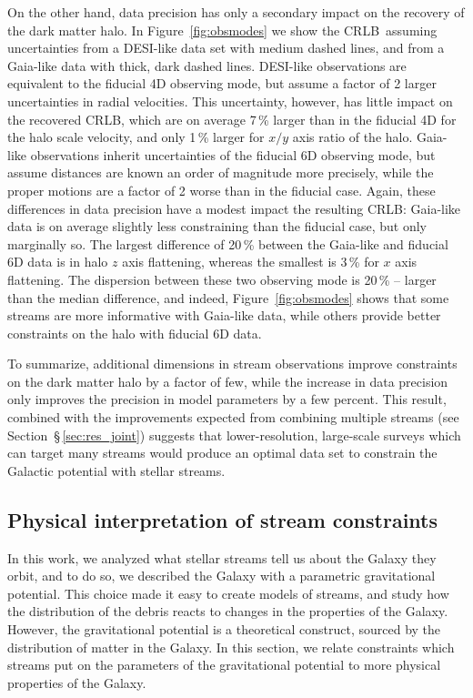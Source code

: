 \documentclass[modern]{aastex61}
\newcommand{\acronym}[1]{{\small{#1}}}
\newcommand{\CRLB}{\acronym{CRLB}}
\begin{document}
On the other hand, data precision has only a secondary impact on the recovery of the dark matter halo.
In Figure~\ref{fig:obsmodes} we show the \CRLB\ assuming uncertainties from a DESI-like data set with medium dashed lines, and from a Gaia-like data with thick, dark dashed lines.
DESI-like observations are equivalent to the fiducial 4D observing mode, but assume a factor of 2 larger uncertainties in radial velocities.
This uncertainty, however, has little impact on the recovered \CRLB, which are on average 7\,\% larger than in the fiducial 4D for the halo scale velocity, and only 1\,\% larger for $x/y$ axis ratio of the halo.
Gaia-like observations inherit uncertainties of the fiducial 6D observing mode, but assume distances are known an order of magnitude more precisely, while the proper motions are a factor of 2 worse than in the fiducial case.
Again, these differences in data precision have a modest impact the resulting \CRLB: Gaia-like data is on average slightly less constraining than the fiducial case, but only marginally so.
The largest difference of 20\,\% between the Gaia-like and fiducial 6D data is in halo $z$ axis flattening, whereas the smallest is 3\,\% for $x$ axis flattening.
The dispersion between these two observing mode is 20\,\% -- larger than the median difference, and indeed, Figure~\ref{fig:obsmodes} shows that some streams are more informative with Gaia-like data, while others provide better constraints on the halo with fiducial 6D data.

To summarize, additional dimensions in stream observations improve constraints on the dark matter halo by a factor of few, while the increase in data precision only improves the precision in model parameters by a few percent.
This result, combined with the improvements expected from combining multiple streams (see Section~\S\,\ref{sec:res_joint}) suggests that lower-resolution, large-scale surveys which can target many streams would produce an optimal data set to constrain the Galactic potential with stellar streams.

\subsection{Physical interpretation of stream constraints}
\label{sec:interpretation}
In this work, we analyzed what stellar streams tell us about the Galaxy they orbit, and to do so, we described the Galaxy with a parametric gravitational potential.
This choice made it easy to create models of streams, and study how the distribution of the debris reacts to changes in the properties of the Galaxy.
However, the gravitational potential is a theoretical construct, sourced by the distribution of matter in the Galaxy.
In this section, we relate constraints which streams put on the parameters of the gravitational potential to more physical properties of the Galaxy.
\end{document}
